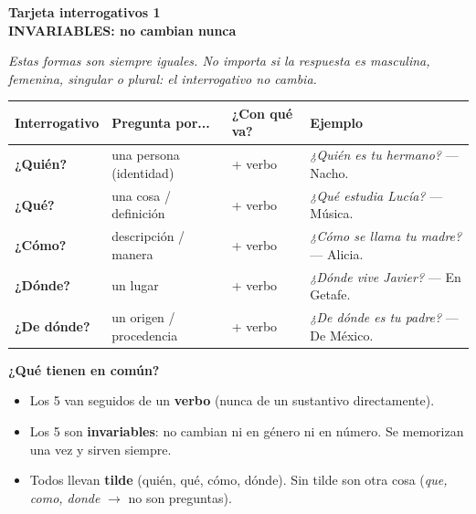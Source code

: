 \documentclass[a4paper,10pt]{article}
\newcommand{\interrheader}[2]{%
  \noindent
  \colorbox{naranjainterr!90}{\parbox{\dimexpr\linewidth-2\fboxsep}{%
    \centering\color{white}\bfseries\large Tarjeta interrogativos #1\\[2pt]
    \normalsize #2%
  }}
  \vspace{4pt}
}
\begin{document}
\newpage


\interrheader{1}{INVARIABLES: no cambian nunca}

\vspace{4pt}
\small
\textit{Estas formas son siempre iguales. No importa si la respuesta es masculina, femenina, singular o plural: el interrogativo no cambia.}

\vspace{6pt}

\begin{center}
\begin{tabular}{|l|p{3.2cm}|l|p{5.5cm}|}
\hline
\rowcolor{naranjainterr!20}
\textbf{Interrogativo} & \textbf{Pregunta por...} & \textbf{¿Con qué va?} & \textbf{Ejemplo} \\
\hline
\textbf{¿Quién?} & una persona (identidad) & + verbo & \textit{¿Quién es tu hermano?} --- Nacho. \\
\hline
\rowcolor{grisclaro}
\textbf{¿Qué?} & una cosa / definición & + verbo & \textit{¿Qué estudia Lucía?} --- Música. \\
\hline
\textbf{¿Cómo?} & descripción / manera & + verbo & \textit{¿Cómo se llama tu madre?} --- Alicia. \\
\hline
\rowcolor{grisclaro}
\textbf{¿Dónde?} & un lugar & + verbo & \textit{¿Dónde vive Javier?} --- En Getafe. \\
\hline
\textbf{¿De dónde?} & un origen / procedencia & + verbo & \textit{¿De dónde es tu padre?} --- De México. \\
\hline
\end{tabular}
\end{center}

\vspace{6pt}

\textbf{¿Qué tienen en común?}
\begin{itemize}[nosep, leftmargin=1.2em]
\item Los 5 van seguidos de un \textbf{verbo} (nunca de un sustantivo directamente).
\item Los 5 son \textbf{invariables}: no cambian ni en género ni en número. Se memorizan una vez y sirven siempre.
\item Todos llevan \textbf{tilde} (quién, qué, cómo, dónde). Sin tilde son otra cosa (\textit{que, como, donde} $\to$ no son preguntas).
\end{itemize}
\end{document}
